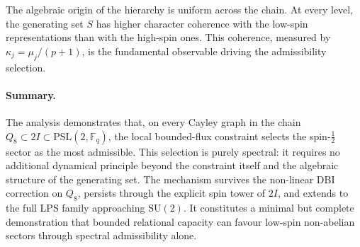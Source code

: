     The algebraic origin of the hierarchy is uniform across the chain.
    At every level, the generating set $S$ has higher character coherence
    with the low-spin representations than with the high-spin ones.
    This coherence, measured by $\kappa_j = \mu_j/(p+1)$, is the
    fundamental observable driving the admissibility selection.

  \paragraph{Summary.}
    The analysis demonstrates that, on every Cayley graph in the chain
    $Q_8 \subset 2I \subset \mathrm{PSL}(2,\mathbb{F}_q)$,
    the local bounded-flux constraint selects the spin-$\tfrac{1}{2}$ sector
    as the most admissible.
    This selection is purely spectral: it requires no additional dynamical
    principle beyond the constraint itself and the algebraic structure of the
    generating set.
    The mechanism survives the non-linear DBI correction on $Q_8$, persists
    through the explicit spin tower of $2I$, and extends to the full LPS family
    approaching $\mathrm{SU}(2)$.
    It constitutes a minimal but complete demonstration that bounded
    relational capacity can favour low-spin non-abelian sectors through
    spectral admissibility alone.
